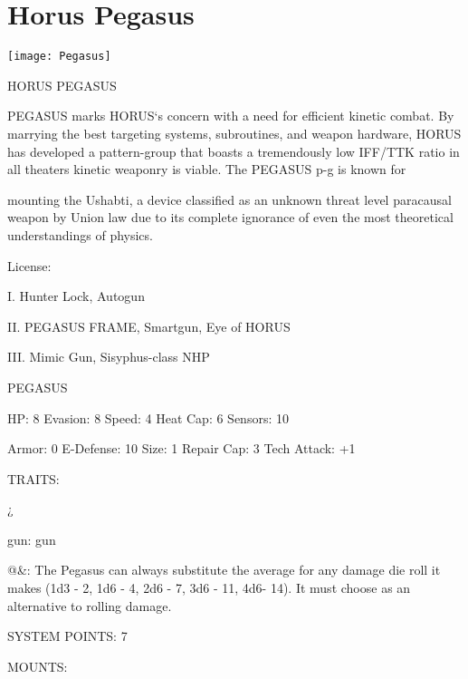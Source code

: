 \section{Horus Pegasus}

\begin{center}
    \texttt{[image: Pegasus]}
\end{center}

                                         HORUS PEGASUS

PEGASUS marks HORUS‘s concern with a need for efficient kinetic combat. By marrying the best targeting
systems, subroutines, and weapon hardware, HORUS has developed a pattern-group that boasts a
tremendously low IFF/TTK ratio in all theaters kinetic weaponry is viable. The PEGASUS p-g is known for

mounting the Ushabti, a device classified as an unknown threat level paracausal weapon by Union law due
to its complete ignorance of even the most theoretical understandings of physics.

                                                  License:

I. Hunter Lock, Autogun

II. PEGASUS FRAME, Smartgun, Eye of HORUS

III. Mimic Gun, Sisyphus-class NHP





                                                    PEGASUS

  HP: 8           Evasion: 8                              Speed: 4            Heat Cap: 6         Sensors: 10

  Armor: 0        E-Defense: 10                           Size: 1             Repair Cap: 3       Tech Attack:
                                                                                                  +1

                                                      TRAITS:

  ¿%

  gun: gun

  @\&: The Pegasus can always substitute the average for any damage die roll it makes  (1d3 - 2, 1d6 - 4,
  2d6 - 7, 3d6 - 11, 4d6- 14). It must choose as an alternative to rolling damage.

                                                SYSTEM POINTS: 7

                                                     MOUNTS:


